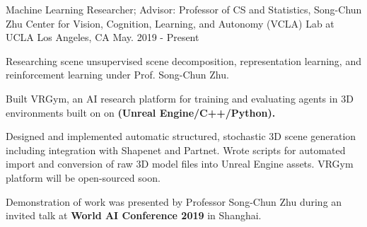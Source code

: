 \cventry
    {Machine Learning Researcher; Advisor: Professor of CS and Statistics, Song-Chun Zhu} %
    {Center for Vision, Cognition, Learning, and Autonomy (VCLA) Lab at UCLA } %
    {Los Angeles, CA} %
    {May. 2019 - Present} %
    {
    \begin{cvitems} %
        \item {Researching scene unsupervised scene decomposition, representation learning, and reinforcement learning under Prof. Song-Chun Zhu.}
        \item {Built VRGym, an AI research platform for training and evaluating agents in
        3D environments built on on \textbf{(Unreal Engine/C++/Python).} } 
        \item {Designed and implemented automatic structured, stochastic 3D scene generation including integration with Shapenet and Partnet. 
        Wrote scripts for automated import and conversion of raw 3D model files into Unreal Engine assets. VRGym platform will be open-sourced soon.}
        \item {Demonstration of work was presented by Professor Song-Chun Zhu during an invited talk at \textbf{World AI Conference 2019} in Shanghai.}
    \end{cvitems}
    }